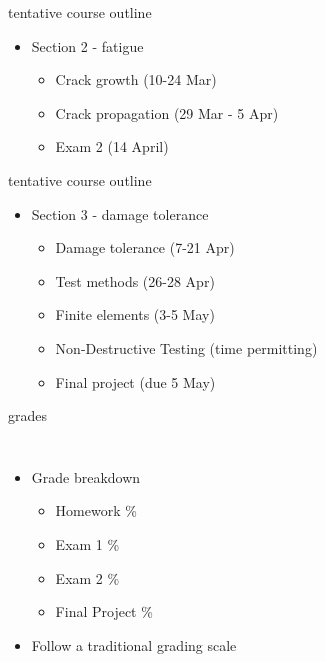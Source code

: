 \documentclass[10pt]{beamer}
\begin{document}
\begin{frame}{tentative course outline}
	\begin{itemize}
		\item Section 2 - fatigue
		\begin{itemize}
			\item Crack growth (10-24 Mar)
			\item Crack propagation (29 Mar - 5 Apr)
			\item Exam 2 (14 April)
		\end{itemize}
	\end{itemize}
\end{frame}

\begin{frame}{tentative course outline}
	\begin{itemize}
		\item Section 3 - damage tolerance
		\begin{itemize}
			\item Damage tolerance (7-21 Apr)
			\item Test methods (26-28 Apr)
			\item Finite elements (3-5 May)
			\item Non-Destructive Testing (time permitting)
			\item Final project (due 5 May)
		\end{itemize}
	\end{itemize}
\end{frame}

\begin{frame}{grades}
\begin{columns}
\begin{itemize}
\item Grade breakdown
	\begin{itemize}
	\item Homework \%
	\item Exam 1 \%
	\item Exam 2 \%
	\item Final Project \%
	\end{itemize}
\item Follow a traditional grading scale
\end{itemize}
\end{columns}
\begin{table}[H]
\end{table}
\end{frame}
\end{document}
